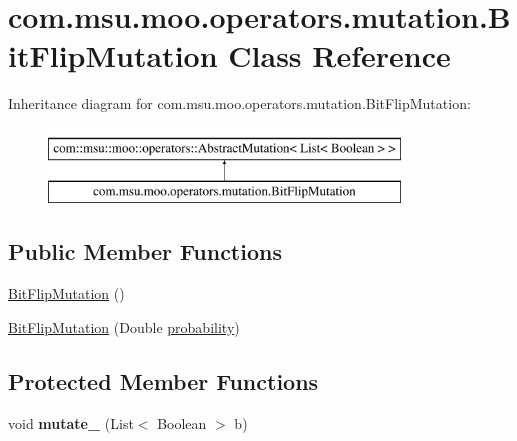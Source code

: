 \hypertarget{classcom_1_1msu_1_1moo_1_1operators_1_1mutation_1_1BitFlipMutation}{\section{com.\-msu.\-moo.\-operators.\-mutation.\-Bit\-Flip\-Mutation Class Reference}
\label{classcom_1_1msu_1_1moo_1_1operators_1_1mutation_1_1BitFlipMutation}
}
Inheritance diagram for com.\-msu.\-moo.\-operators.\-mutation.\-Bit\-Flip\-Mutation\-:\begin{figure}[H]
\begin{center}
\leavevmode
\includegraphics[height=2.000000cm]{classcom_1_1msu_1_1moo_1_1operators_1_1mutation_1_1BitFlipMutation}
\end{center}
\end{figure}
\subsection*{Public Member Functions}
\begin{DoxyCompactItemize}
\item 
\hyperlink{classcom_1_1msu_1_1moo_1_1operators_1_1mutation_1_1BitFlipMutation_a1acc2ca05bdc3e678e3614199ef5f619}{Bit\-Flip\-Mutation} ()
\item 
\hyperlink{classcom_1_1msu_1_1moo_1_1operators_1_1mutation_1_1BitFlipMutation_a15bc402d2403f5980fc7b246420175b8}{Bit\-Flip\-Mutation} (Double \hyperlink{classcom_1_1msu_1_1moo_1_1operators_1_1mutation_1_1BitFlipMutation_a171f6a7c34816318f48116e75eca4b7c}{probability})
\end{DoxyCompactItemize}
\subsection*{Protected Member Functions}
\begin{DoxyCompactItemize}
\item 
\hypertarget{classcom_1_1msu_1_1moo_1_1operators_1_1mutation_1_1BitFlipMutation_aa239884ac2562908ae65b5f129623e27}{void {\bfseries mutate\-\_\-} (List$<$ Boolean $>$ b)}\label{classcom_1_1msu_1_1moo_1_1operators_1_1mutation_1_1BitFlipMutation_aa239884ac2562908ae65b5f129623e27}

\end{DoxyCompactItemize}
